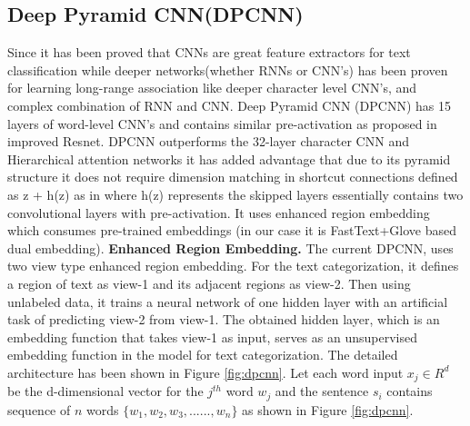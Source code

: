\documentclass[sigconf]{acmart}
\begin{document}
\subsection{Deep Pyramid CNN(DPCNN)}\label{dpcnn}
Since it has been proved that CNNs are great feature extractors for text classification\cite{yin2017comparative, kim2014convolutional, johnson2014effective, johnson2015semi, johnson2016convolutional, johnson2017deep} while deeper networks(whether RNNs or CNN's) has been proven for learning long-range association like deeper character level CNN's\cite{zhang2015character, conneau2016very}, and complex combination of RNN and CNN\cite{peng2019hierarchical, shen2019towards, jiao2019higru, yu2018mattnet, yang2016hierarchical}. Deep Pyramid CNN (DPCNN)\cite{johnson2017deep} has 15 layers of word-level CNN's and contains similar pre-activation as proposed in improved Resnet\cite{he2016identity}. DPCNN outperforms the 32-layer character CNN\cite{conneau2016very} and Hierarchical attention networks\cite{yang2016hierarchical} it has added advantage that due to its pyramid structure it does not require dimension matching in shortcut connections defined as z +  h(z) as in\cite{he2016identity} where h(z) represents the skipped layers essentially contains two convolutional layers with pre-activation. It uses enhanced region embedding which consumes pre-trained embeddings (in our case it is FastText+Glove based dual embedding).
\newline \textbf{Enhanced Region Embedding.} The current DPCNN\cite{johnson2017deep}, uses two view type enhanced region embedding. For the text categorization, it defines a region of text as view-1 and its adjacent regions as view-2. Then using unlabeled data, it trains a neural network of one hidden layer with an artificial task of predicting view-2 from view-1. The obtained hidden layer, which is an embedding function that takes view-1 as input, serves as an unsupervised embedding function in the model for text categorization. The detailed architecture has been shown in Figure \ref{fig:dpcnn}. 
\newline Let each word input $x_j \in R^d$ be the d-dimensional vector for the $j^{th}$ word $w_{j}$ and the sentence $s_i$ contains sequence of $n$ words $\{w_{1},w_{2},w_{3},......,w_{n}\}$ as shown in Figure \ref{fig:dpcnn}.
\end{document}
